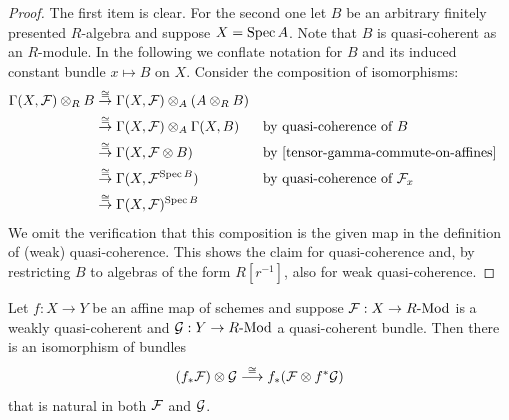 \begin{proof}
  The first item is clear.
  For the second one let $B$ be an arbitrary finitely presented $R$-algebra and suppose $X = \operatorname{Spec} A$.
  Note that $B$ is quasi-coherent as an $R$-module.
  In the following we conflate notation for $B$ and its induced constant bundle $x \mapsto B$ on $X$.
  Consider the composition of isomorphisms:
  \begin{align*}
    \Gamma(X, \mc F) \otimes_R B &\overset{\cong}{\rightarrow} \Gamma(X,\mc F) \otimes_A (A \otimes_R B) \\
                                 &\overset{\cong}{\rightarrow} \Gamma(X,\mc F) \otimes_A \Gamma(X,B)
                                 &&\text{by quasi-coherence of $B$} \\
                                 &\overset{\cong}{\rightarrow} \Gamma(X, \mc F \otimes B)
                                 &&\text{by \Cref{tensor-gamma-commute-on-affines}} \\
                                 &\overset{\cong}{\rightarrow} \Gamma(X, {\mc F}^{\Spec B})
                                 &&\text{by quasi-coherence of $\mc F_x$} \\
                                 &\overset{\cong}{\rightarrow} \Gamma(X,\mc F)^{\Spec B}
  \end{align*}
  We omit the verification that this composition is the given map in the definition of (weak) quasi-coherence.
  This shows the claim for quasi-coherence and, by restricting $B$ to algebras of the form $R[r^{-1}]$, also for weak quasi-coherence.
\end{proof}


\begin{lemma}
  \label{projection-formula-I}
  Let $f : X \to Y$ be an affine map of schemes and suppose $\mathcal{F} : X \to R\text{-}\mathrm{Mod}$ is a weakly quasi-coherent and $\mathcal{G} : Y \to R\text{-}\mathrm{Mod}$ a quasi-coherent bundle.
  Then there is an isomorphism of bundles
  \[
    (f_\ast\mathcal{F}) \otimes \mathcal{G}
    \overset{\cong}{\longrightarrow}
    f_\ast(\mathcal{F} \otimes f^\ast \mathcal{G})
  \]
  that is natural in both $\mathcal{F}$ and $\mathcal{G}$.
\end{lemma}

